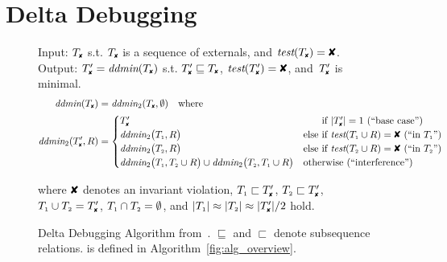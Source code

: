 \section{Delta Debugging}


\begin{figure*}[t!]
\footnotesize
\begin{boxedminipage}{\textwidth}
Input: $\cfail$ s.t. $\cfail$ is a sequence of externals, and $\test(\cfail) = \DFAIL$. Output: $\dfail
= \ddmin(\cfail)$ s.t. $\dfail \sqsubseteq
\cfail$, $\test(\dfail) = \DFAIL$, and~$\dfail$ is minimal.
\begin{align*}
\ddmin(\cfail) &= \ddmin_2(\cfail, \emptyset) \quad \text{where} \\
\ddmin_2(\dfail, R) &=
\begin{cases}
\dfail & \text{\hphantom{else }if $|\dfail| = 1$ (``base case'')} \\
\ddmin_2\bigl(\done, R\bigr) &
\text{else if $\test(\done \cup R) = \DFAIL$ (``in $\done$'')} \\
\ddmin_2\bigl(\dtwo, R\bigr) &
\text{else if $\test(\dtwo \cup R) = \DFAIL$ (``in $\dtwo$'')} \\
\ddmin_2\bigl(\done, \dtwo \cup R\bigr) \cup \ddmin_2\bigl(\dtwo, \done \cup
R\bigr) & \text{otherwise (``interference'')}
\end{cases}
\end{align*}
\begin{center}
where $\DFAIL$ denotes an invariant violation,
$\done \sqsubset \dfail$, $\dtwo \sqsubset \dfail$, $\done \cup \dtwo = \dfail$, ${T_{\scriptscriptstyle 1}} \cap
{T_{\scriptscriptstyle 2}} = \emptyset$, and $|\done| \approx |\dtwo| \approx |\dfail| / 2$
hold.
\end{center}
\end{boxedminipage}
\caption{Delta Debugging Algorithm
from~\cite{Zeller:1999:YMP:318773.318946}. $\sqsubseteq$ and $\sqsubset$ denote
subsequence relations.  is defined in Algorithm~\ref{fig:alg_overview}.}
\label{fig:ddmin}
\end{figure*}

